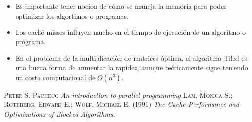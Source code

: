 \documentclass[a4paper,12pt]{article}
\begin{document}
\begin{itemize}
 \item Es importante tener nocion de cómo se maneja la memoria para poder optimizar los algortimos o programas.
 \item Los caché misses influyen mucho en el tiempo de ejecución de un algoritmo o programa.
 \item En el problema de la multiplicación de matrices óptima, el algoritmo Tiled es una buena forma de aumentar
 la rapidez, aunque teóricamente sigue teniendo un costo computacional de $O(n^{3})$.
\end{itemize}

\begin{thebibliography}{adasda}
   \textsc{Peter S. Pacheco} \textit{An introduction to parallel programming}
   \textsc{Lam, Monica S.; Rothberg, Edward E.; Wolf, Michael E.} (1991) \textit{The Cache Performance and Optimizations of Blocked Algorithms.}
\end{thebibliography}
\end{document}
